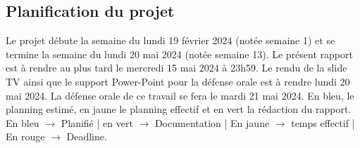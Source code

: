 \newpage
\begin{landscape}
\subsection{Planification du projet}
Le projet débute la semaine du lundi 19 février 2024  (notée semaine 1) et se termine la semaine du lundi 20 mai 2024 (notée semaine 13). Le présent rapport est à rendre au plus tard le mercredi 15 mai 2024 à 23h59. Le rendu de la slide TV ainsi que le support Power-Point pour la défense orale est à rendre lundi 20 mai 2024. La défense orale de ce travail se fera le mardi 21 mai 2024. En bleu, le planning estimé, en jaune le planning effectif et en vert la rédaction du rapport. \textcolor{myBlue}{En bleu $\rightarrow$ Planifié} | \textcolor{myGreen}{en vert $\rightarrow$ Documentation} | \textcolor{myYellow}{En jaune $\rightarrow$ temps effectif} | \textcolor{myRed}{En rouge $\rightarrow$ Deadline}.\\


\end{landscape}
